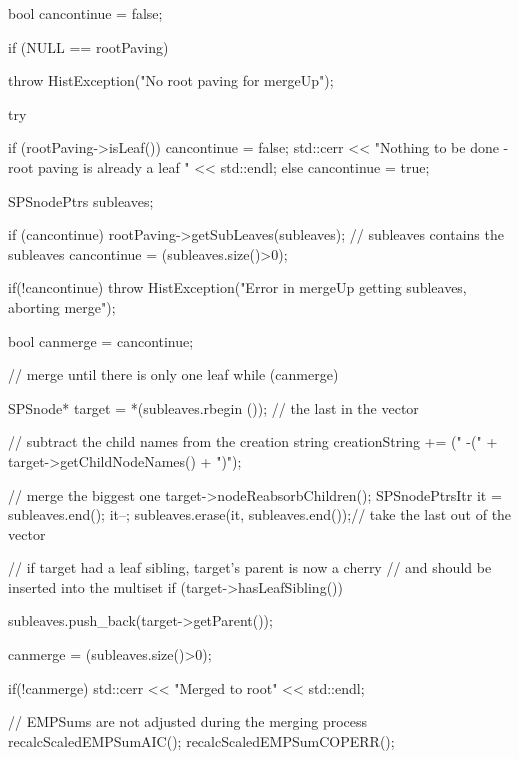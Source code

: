 \begin{DoxyCode}
{
    bool cancontinue = false;

    if (NULL == rootPaving) {
        throw HistException("No root paving for mergeUp");

    }

    try {

        if (rootPaving->isLeaf()) {
            cancontinue = false;
            std::cerr << "Nothing to be done - root paving is already a leaf "
                    << std::endl;
        }
        else cancontinue = true;

        SPSnodePtrs subleaves;

        if (cancontinue) {
            rootPaving->getSubLeaves(subleaves); // subleaves contains the
       subleaves
            cancontinue = (subleaves.size()>0);
        }

        if(!cancontinue) {
            throw HistException("Error in mergeUp getting subleaves, aborting
       merge");
        }

        bool canmerge = cancontinue;

        // merge until there is only one leaf
        while (canmerge) {

            SPSnode* target = *(subleaves.rbegin ()); // the last in the vector

            // subtract the child names from the creation string
                creationString += (" -(" + target->getChildNodeNames() + ")");

            // merge the biggest one
            target->nodeReabsorbChildren();
            SPSnodePtrsItr it = subleaves.end();
            it--;
            subleaves.erase(it, subleaves.end());// take the last out of the
       vector

            // if target had a leaf sibling, target's parent is now a cherry
            // and should be inserted into the multiset
            if (target->hasLeafSibling()) {

                subleaves.push_back(target->getParent());
           }

            canmerge = (subleaves.size()>0);
        }

        if(!canmerge) {
            std::cerr << "Merged to root" << std::endl;
        }

        // EMPSums are not adjusted during the merging process
        recalcScaledEMPSumAIC();
        recalcScaledEMPSumCOPERR();
    }

}
\end{DoxyCode}
